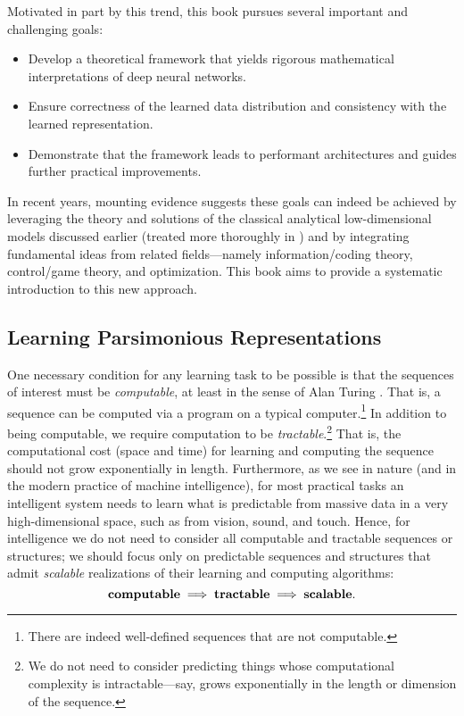 \documentclass[../../book-main.tex]{subfiles}
\begin{document}
Motivated in part by this trend, this book pursues several important and challenging goals:
\begin{itemize}
    \item Develop a theoretical framework that yields rigorous mathematical interpretations of deep neural networks.
    \item Ensure correctness of the learned data distribution and consistency with the learned representation.
    \item Demonstrate that the framework leads to performant architectures and guides further practical improvements.
\end{itemize}
In recent years, mounting evidence suggests these goals can indeed be achieved by leveraging the theory and solutions of the classical analytical low-dimensional models discussed earlier (treated more thoroughly in ) and by integrating fundamental ideas from related fields---namely information/coding theory, control/game theory, and optimization. This book aims to provide a systematic introduction to this new approach.

\subsection{Learning Parsimonious Representations}
\label{sec:computational-approach-compression}
One necessary condition for any learning task to be possible is that the sequences of interest must be \textit{computable}, at least in the sense of Alan Turing \cite{Turing-1936}. That is, a sequence can be computed via a program on a typical computer.\footnote{There are indeed well-defined sequences that are not computable.} In addition to being computable, we require computation to be \textit{tractable}.\footnote{We do not need to consider predicting things whose computational complexity is intractable---say, grows exponentially in the length or dimension of the sequence.} That is, the computational cost (space and time) for learning and computing the sequence should not grow exponentially in length. Furthermore, as we see in nature (and in the modern practice of machine intelligence), for most practical tasks an intelligent system needs to learn what is predictable from massive data in a very high-dimensional space, such as from vision, sound, and touch. Hence, for intelligence we do not need to consider all computable and tractable sequences or structures; we should focus only on predictable sequences and structures that admit \textit{scalable} realizations of their learning and computing algorithms:
\begin{equation}
\text{\textbf{computable}} \;
   \Longrightarrow \; \text{\textbf{tractable}} \; \Longrightarrow \; 
   \text{\textbf{scalable}}.
\end{equation}
\end{document}
